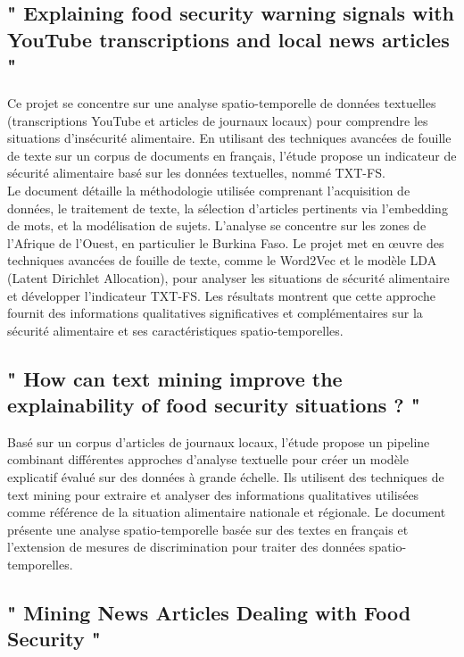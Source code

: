 \documentclass{article}
\begin{document}
\subsection{" Explaining food security warning signals with YouTube transcriptions and local news articles "}

Ce projet se concentre sur une analyse spatio-temporelle de données textuelles (transcriptions YouTube et articles de journaux locaux) pour comprendre les situations d'insécurité alimentaire. En utilisant des techniques avancées de fouille de texte sur un corpus de documents en français, l'étude propose un indicateur de sécurité alimentaire basé sur les données textuelles, nommé TXT-FS. \\

Le document détaille la méthodologie utilisée comprenant l'acquisition de données, le traitement de texte, la sélection d'articles pertinents via l'embedding de mots, et la modélisation de sujets. L'analyse se concentre sur les zones de l'Afrique de l'Ouest, en particulier le Burkina Faso. Le projet met en œuvre des techniques avancées de fouille de texte, comme le Word2Vec et le modèle LDA (Latent Dirichlet Allocation), pour analyser les situations de sécurité alimentaire et développer l'indicateur TXT-FS. Les résultats montrent que cette approche fournit des informations qualitatives significatives et complémentaires sur la sécurité alimentaire et ses caractéristiques spatio-temporelles. 

\subsection{" How can text mining improve the explainability of food security situations ? "}

Basé sur un corpus d'articles de journaux locaux, l'étude propose un pipeline combinant différentes approches d'analyse textuelle pour créer un modèle explicatif évalué sur des données à grande échelle. Ils utilisent des techniques de text mining pour extraire et analyser des informations qualitatives utilisées comme référence de la situation alimentaire nationale et régionale. Le document présente une analyse spatio-temporelle basée sur des textes en français et l'extension de mesures de discrimination pour traiter des données spatio-temporelles.

\subsection{" Mining News Articles Dealing with Food Security "}
\end{document}
